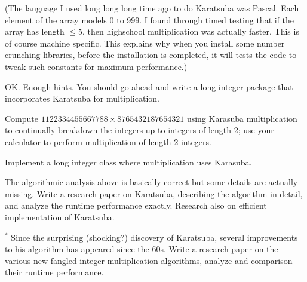 (The language I used long long long time ago to do Karatsuba
was Pascal.
Each element of the array models 0 to 999.
I found through timed testing that if the array has length $\leq 5$,
then highschool multiplication was actually faster.
This is of course machine specific.
This explains why when you install some number crunching libraries,
before the installation is completed, it will tests the code to tweak
such constants for maximum performance.)

OK. 
Enough hints.
You should go ahead and write a long integer package that 
incorporates 
Karatsuba for multiplication.

\begin{ex}
Compute $1122334455667788 \times 8765432187654321$ using
Karasuba multiplication to continually breakdown the integers
up to integers of length 2;
use your calculator to perform multiplication of length 2 integers.
\end{ex}

\begin{ex}
Implement a long integer class where multiplication uses
Karasuba.
\end{ex}

\begin{ex}
The algorithmic analysis above is basically correct
but some details are actually missing.
Write a research paper on Karatsuba, describing the algorithm in detail,
and analyze the runtime performance exactly.
Research also on efficient implementation of Karatsuba.
\end{ex}

\begin{ex}$^*$
Since the surprising (shocking?) discovery of Karatsuba,
several improvements to his algorithm has appeared since the 60s.
Write a research paper on the various new-fangled integer multiplication
algorithms, analyze and comparison their runtime performance.
\end{ex}
